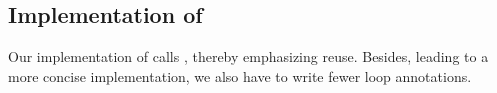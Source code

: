 

\clearpage

\subsection{Implementation of \findfirstof}

Our implementation of  calls ,
thereby emphasizing reuse.
Besides, leading to a more concise implementation, we also have to write fewer loop annotations.



\clearpage

